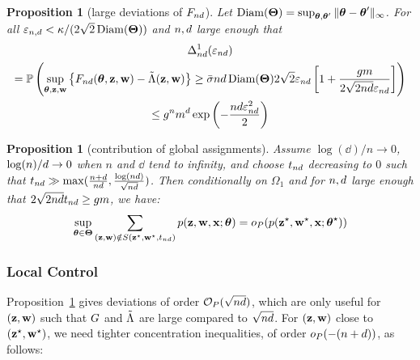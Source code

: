\documentclass[bj]{imsart}
\numberwithin{equation}{section}
\theoremstyle{plain}
\newtheorem{proposition}[thm]{Proposition}
\theoremstyle{remark}
\begin{document}
\begin{proposition}[large deviations of $F_{nd}$]
  \label{prop:conditional-likelihood-convergence}
  Let $\operatorname{Diam}(\boldsymbol{\Theta}) = \sup_{\boldsymbol{\theta}, \boldsymbol{\theta}'} \|\boldsymbol{\theta} - \boldsymbol{\theta}' \|_{\infty}$. For all $\varepsilon_{n, d} < \kappa / (2\sqrt{2}\operatorname{Diam}(\boldsymbol{\Theta}))$ and $n, d$ large enough that 
  \begin{multline}
    \label{eq:conditional-likelihood-convergence}
    \Delta_{\n\dd}^1(\vareps_{\n\dd})\\ = \Prob\left( \sup_{\btheta, \bz, \bw} \left\{ \Fnd(\btheta, \bz, \bw) - \Lambtilde(\bz,\bw) \right\} \geq \vmax \n\dd \Diam(\bTheta) 2\sqrt{2}\vareps_{\n\dd}\left[1 + \frac{\g\m}{2\sqrt{2\n\dd}\vareps_{\n\dd}} \right] \right) \\ 
    \leq \g^{\n} \m^{\dd} \exp\left( - \frac{\n\dd\vareps_{\n\dd}^2} {2}\right)
  \end{multline}
\end{proposition}

\begin{proposition}[contribution of global assignments]
  \label{prop:large-deviations-profile-likelihood}
  Assume $\log(\dd)/n \to 0$, $\log(n)/d \to 0$ when $n$ and $\dd$ tend to infinity, and choose $t_{nd}$ decreasing to $0$ such that $t_{nd} \gg \max(\frac{n+d}{nd}, \frac{\log(nd)}{\sqrt{nd}})$. Then conditionally on $\Omega_1$ and for $n,d$ large enough that $2\sqrt{2nd}t_{nd} \geq gm$, we have:
  \begin{equation*}
    \sup_{\btheta \in \bTheta} \sum_{(\bz, \bw) \notin S(\bzs, \bws, \tnd)} \prob(\bz, \bw, \bx; \btheta) = \smallO_P( \prob(\bzs, \bws, \bx; \bthetas) )
  \end{equation*}
\end{proposition}

\subsubsection{Local Control}

Proposition~\ref{prop:conditional-likelihood-convergence} gives deviations of order $\mathcal{O}_{P}(\sqrt{nd})$, which are only useful for $(\mathbf{z}, \mathbf{w})$ such that $G$ and $\tilde{\Lambda}$ are large compared to $\sqrt{nd}$. For $(\mathbf{z}, \mathbf{w})$ close to $(\mathbf{z}^\star, \mathbf{w}^\star)$, we need tighter concentration inequalities, of order $o_P(-(n+d))$, as follows:
\end{document}
